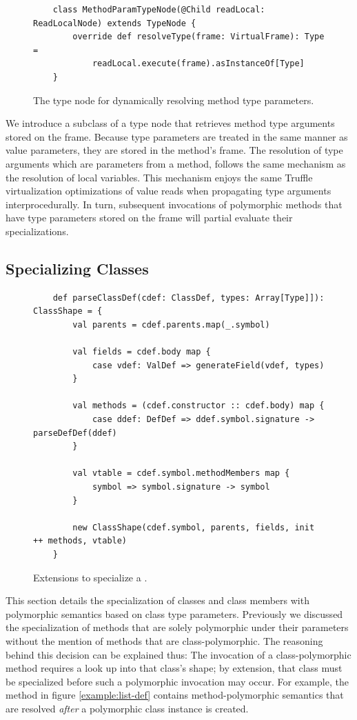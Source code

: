 \begin{figure}[!htb]
	\begin{verbatim}
	class MethodParamTypeNode(@Child readLocal: ReadLocalNode) extends TypeNode {
		override def resolveType(frame: VirtualFrame): Type = 
			readLocal.execute(frame).asInstanceOf[Type]
	}
	\end{verbatim}
	\caption{The type node for dynamically resolving method type parameters.}
	\label{impl:method-param-typenode}
\end{figure}

We introduce a subclass of a type node that retrieves method type arguments stored on the frame.
Because type parameters are treated in the same manner as value parameters, they are stored in the method's frame.
The resolution of type arguments which are parameters from a method, follows the same mechanism as the resolution of local variables.
This mechanism enjoys the same Truffle virtualization optimizations of value reads when propagating type arguments interprocedurally.
In turn, subsequent invocations of polymorphic methods that have type parameters stored on the frame will partial evaluate their specializations.

\subsection{Specializing Classes}

\begin{figure}[!htb]
	\begin{verbatim}
	def parseClassDef(cdef: ClassDef, types: Array[Type]]): ClassShape = {
		val parents = cdef.parents.map(_.symbol)
			
		val fields = cdef.body map {
			case vdef: ValDef => generateField(vdef, types)	
		}
		
		val methods = (cdef.constructor :: cdef.body) map {
			case ddef: DefDef => ddef.symbol.signature -> parseDefDef(ddef)
		}
			
		val vtable = cdef.symbol.methodMembers map {
			symbol => symbol.signature -> symbol
		}
			
		new ClassShape(cdef.symbol, parents, fields, init ++ methods, vtable)
	}
	\end{verbatim}
	\caption{Extensions to specialize a .}
	\label{impl:specialize-class}
\end{figure}

This section details the specialization of classes and class members with polymorphic semantics based on class type parameters.
Previously we discussed the specialization of methods that are solely polymorphic under their parameters without the mention of methods that are class-polymorphic.
The reasoning behind this decision can be explained thus: The invocation of a class-polymorphic method requires a look up into that class's shape; by extension, that class must be specialized before such a polymorphic invocation may occur.
For example, the method  in figure \ref{example:list-def} contains method-polymorphic semantics that are resolved \textit{after} a polymorphic class instance is created.

